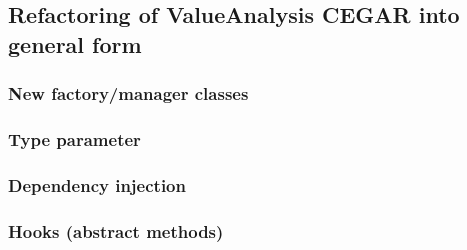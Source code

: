 \subsection{Refactoring of ValueAnalysis CEGAR into general form}
\subsubsection{New factory/manager classes}
\subsubsection{Type parameter}
\subsubsection{Dependency injection}
\subsubsection{Hooks (abstract methods)}
